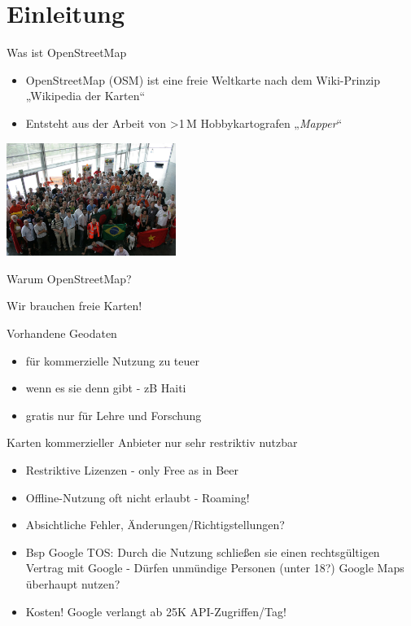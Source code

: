\documentclass{beamer}
\begin{document}
\section{Einleitung}

\begin{frame}{Was ist OpenStreetMap}

\begin{itemize}
  \item OpenStreetMap (OSM) ist eine freie Weltkarte nach dem Wiki-Prinzip „Wikipedia der Karten“
\pause
  \item Entsteht aus der Arbeit von \textgreater 1\,M Hobbykartografen „\emph{Mapper}“
\end{itemize}

 \begin{center}
 \includegraphics[width=5.5cm]{sotm.jpg}
 \end{center}

\end{frame}


\begin{frame}{Warum OpenStreetMap?}

Wir brauchen freie Karten!

\pause
\vspace{2mm}
Vorhandene Geodaten 
\begin{itemize}
  \item	für kommerzielle Nutzung zu teuer
  \item	wenn es sie denn gibt - zB Haiti
  \item	gratis nur für Lehre und Forschung
\end{itemize}

\pause
\vspace{2mm}
Karten kommerzieller Anbieter nur sehr restriktiv nutzbar
\begin{itemize}
  \item Restriktive Lizenzen - only Free as in Beer
  \item Offline-Nutzung oft nicht erlaubt - Roaming!
  \item Absichtliche Fehler, Änderungen/Richtigstellungen?
  \pause
  \item Bsp Google TOS: Durch die Nutzung schließen sie einen rechtsgültigen Vertrag mit Google - Dürfen unmündige Personen (unter 18?) Google Maps überhaupt nutzen?
  \item Kosten! Google verlangt ab 25K API-Zugriffen/Tag!
\end{itemize}

\end{frame}
\end{document}
